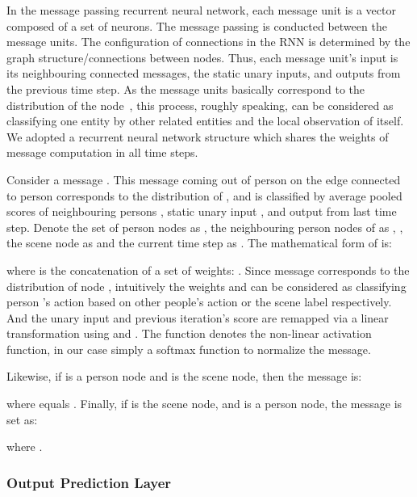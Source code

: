 \documentclass[10pt,twocolumn,letterpaper]{article}
\begin{document}
\vspace{-1.5mm}

In the message passing recurrent neural network, each message unit is a vector composed of a set of neurons. The message passing is conducted between the message units. The configuration of connections in the RNN is determined by the graph structure/connections between nodes. Thus, each message unit's input is its neighbouring connected messages, the static unary inputs, and outputs from the previous time step. As the message units basically correspond to the distribution of the node~\cite{RossMHB11}, this process, roughly speaking, can be considered as classifying one entity by other related entities and the local observation of itself. We adopted a recurrent neural network structure which shares the weights of message computation in all time steps.




Consider a message . This message coming out of person  on the edge connected to person  corresponds to the distribution of , and is classified by average pooled scores of neighbouring persons , static unary input , and output  from last time step. Denote the set of person nodes as , the neighbouring person nodes of  as , , the scene node as  and the current time step as . The mathematical form of  is:


where  is the concatenation of a set of weights: . Since message  corresponds to the distribution of node , intuitively the weights  and  can be considered as classifying person 's action based on other people's action or the scene label respectively. And the unary input  and previous iteration's score  are remapped via a linear transformation using  and . The function  denotes the non-linear activation function, in our case simply a softmax function to normalize the message.



Likewise, if  is a person node and  is the scene node, then the message  is:

where  equals . Finally, if  is the scene node, and  is a person node, the message  is set as:

where .






\vspace{-2mm}
\subsubsection{Output Prediction Layer} 
\vspace{-1mm}
\end{document}
